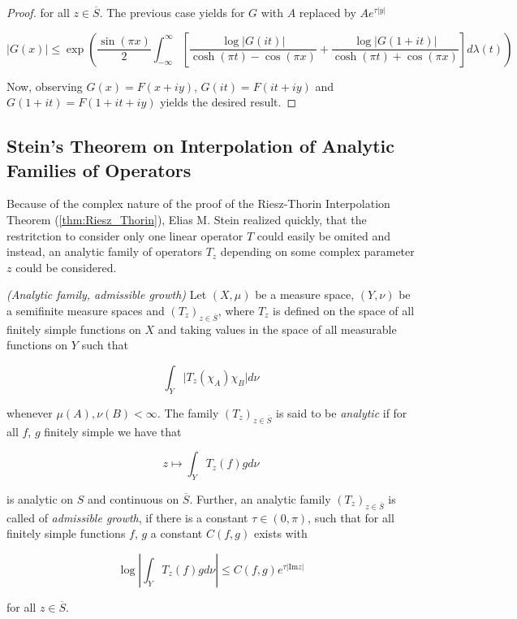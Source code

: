 \begin{proof}
		for all $z \in \overline{S}$. The previous case yields for $G$ with $A$ replaced by $Ae^{\tau\vert y \vert}$

		\begin{equation}
			\vert G(x) \vert \leqslant \exp\left( \frac{\sin(\pi x)}{2} \int_{-\infty}^\infty \left[ \frac{\log \vert G(it)\vert}{\cosh(\pi t) - \cos(\pi x)} + \frac{\log \vert G(1 + it)\vert}{\cosh(\pi t) + \cos(\pi x)} \right] d\lambda(t)\right)
		\end{equation}

		Now, observing $G(x) = F(x + iy)$, $G(it) = F(it + iy)$ and $G(1 + it) = F(1 + it + iy)$ yields the desired result.
\end{proof}

\subsection{Stein's Theorem on Interpolation of Analytic Families of Operators}
Because of the complex nature of the proof of the Riesz-Thorin Interpolation Theorem (\ref{thm:Riesz_Thorin}), Elias M. Stein realized quickly, that the restritction to consider only one linear operator $T$ could easily be omited and instead, an analytic family of operators $T_z$ depending on some complex parameter $z$ could be considered.

\vspace{2mm}

\begin{mdframed}
	\begin{definition}\emph{(Analytic family, admissible growth)}
		Let $(X,\mu)$ be a measure space, $(Y,\nu)$ be a semifinite measure spaces and $\left( T_z \right)_{z \in \overline{S}}$, where $T_z$ is defined on the space of all finitely simple functions on $X$ and taking values in the space of all measurable functions on $Y$ such that

		\begin{equation}
			\int_Y \vert T_z(\chi_A)\chi_B \vert d\nu
		\end{equation}

		whenever $\mu(A),\nu(B) < \infty$. The family $\left( T_z \right)_{z \in \overline{S}}$ is said to be \emph{analytic} if for all $f$, $g$ finitely simple we have that

		\begin{equation}
			z \mapsto \int_Y T_z(f)gd\nu
		\end{equation}

		is analytic on $S$ and continuous on $\overline{S}$. Further, an analytic family $\left( T_z \right)_{z \in \overline{S}}$ is called of \emph{admissible growth}, if there is a constant $\tau \in (0,\pi)$, such that for all finitely simple functions $f$, $g$ a constant $C(f,g)$ exists with

			\begin{equation}
				\log\left\vert \int_Y T_z(f) g d\nu\right\vert \leqslant C(f,g)e^{\tau\vert \mathrm{Im}z\vert}
			\end{equation}

			for all $z \in \overline{S}$.
	\end{definition}
\end{mdframed}


